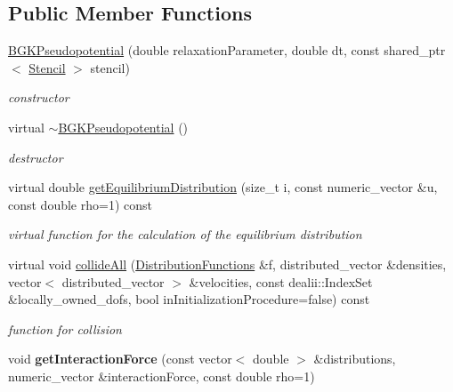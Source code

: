 \subsection*{Public Member Functions}
\begin{DoxyCompactItemize}
\item 
\hypertarget{classnatrium_1_1BGKPseudopotential_a47344e97049c04a1e28a43474d5b04ca}{
\hyperlink{classnatrium_1_1BGKPseudopotential_a47344e97049c04a1e28a43474d5b04ca}{BGKPseudopotential} (double relaxationParameter, double dt, const shared\_\-ptr$<$ \hyperlink{classnatrium_1_1Stencil}{Stencil} $>$ stencil)}
\label{classnatrium_1_1BGKPseudopotential_a47344e97049c04a1e28a43474d5b04ca}

\begin{DoxyCompactList}\small\item\em constructor \item\end{DoxyCompactList}\item 
\hypertarget{classnatrium_1_1BGKPseudopotential_ac60f2eeed9c101141b29dd0cbee40932}{
virtual \hyperlink{classnatrium_1_1BGKPseudopotential_ac60f2eeed9c101141b29dd0cbee40932}{$\sim$BGKPseudopotential} ()}
\label{classnatrium_1_1BGKPseudopotential_ac60f2eeed9c101141b29dd0cbee40932}

\begin{DoxyCompactList}\small\item\em destructor \item\end{DoxyCompactList}\item 
virtual double \hyperlink{classnatrium_1_1BGKPseudopotential_a63ce98e44a07466963fb123cac9dd905}{getEquilibriumDistribution} (size\_\-t i, const numeric\_\-vector \&u, const double rho=1) const 
\begin{DoxyCompactList}\small\item\em virtual function for the calculation of the equilibrium distribution \item\end{DoxyCompactList}\item 
virtual void \hyperlink{classnatrium_1_1BGKPseudopotential_a5f40f5076273f9ec38f3078c891b453c}{collideAll} (\hyperlink{classnatrium_1_1DistributionFunctions}{DistributionFunctions} \&f, distributed\_\-vector \&densities, vector$<$ distributed\_\-vector $>$ \&velocities, const dealii::IndexSet \&locally\_\-owned\_\-dofs, bool inInitializationProcedure=false) const 
\begin{DoxyCompactList}\small\item\em function for collision \item\end{DoxyCompactList}\item 
\hypertarget{classnatrium_1_1BGKPseudopotential_a7129a321a07b85ac6245d71190eeeedd}{
void {\bfseries getInteractionForce} (const vector$<$ double $>$ \&distributions, numeric\_\-vector \&interactionForce, const double rho=1)}
\label{classnatrium_1_1BGKPseudopotential_a7129a321a07b85ac6245d71190eeeedd}


\end{DoxyCompactItemize}
